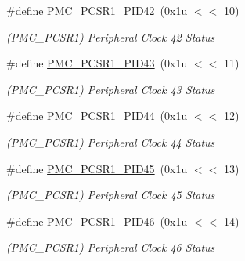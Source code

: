\begin{DoxyCompactItemize}
\mbox{\label{group__SAMV71__PMC_gaa9dabc6093c0bf2f44a76f602881e210}} 
\#define \mbox{\hyperlink{group__SAMV71__PMC_gaa9dabc6093c0bf2f44a76f602881e210}{P\+M\+C\+\_\+\+P\+C\+S\+R1\+\_\+\+P\+I\+D42}}~(0x1u $<$$<$ 10)
\begin{DoxyCompactList}\small\item\em (P\+M\+C\+\_\+\+P\+C\+S\+R1) Peripheral Clock 42 Status \end{DoxyCompactList}\item 
\mbox{\label{group__SAMV71__PMC_ga373fe9910cd34f16ddfe94f47b70b156}} 
\#define \mbox{\hyperlink{group__SAMV71__PMC_ga373fe9910cd34f16ddfe94f47b70b156}{P\+M\+C\+\_\+\+P\+C\+S\+R1\+\_\+\+P\+I\+D43}}~(0x1u $<$$<$ 11)
\begin{DoxyCompactList}\small\item\em (P\+M\+C\+\_\+\+P\+C\+S\+R1) Peripheral Clock 43 Status \end{DoxyCompactList}\item 
\mbox{\label{group__SAMV71__PMC_ga39088bffa9395fcc9a36b177be66f004}} 
\#define \mbox{\hyperlink{group__SAMV71__PMC_ga39088bffa9395fcc9a36b177be66f004}{P\+M\+C\+\_\+\+P\+C\+S\+R1\+\_\+\+P\+I\+D44}}~(0x1u $<$$<$ 12)
\begin{DoxyCompactList}\small\item\em (P\+M\+C\+\_\+\+P\+C\+S\+R1) Peripheral Clock 44 Status \end{DoxyCompactList}\item 
\mbox{\label{group__SAMV71__PMC_gaa76b2bc1b35ecaa102bf67d62b2b8cc3}} 
\#define \mbox{\hyperlink{group__SAMV71__PMC_gaa76b2bc1b35ecaa102bf67d62b2b8cc3}{P\+M\+C\+\_\+\+P\+C\+S\+R1\+\_\+\+P\+I\+D45}}~(0x1u $<$$<$ 13)
\begin{DoxyCompactList}\small\item\em (P\+M\+C\+\_\+\+P\+C\+S\+R1) Peripheral Clock 45 Status \end{DoxyCompactList}\item 
\mbox{\label{group__SAMV71__PMC_ga0fefdfeff233dd72261c66e41433fb6d}} 
\#define \mbox{\hyperlink{group__SAMV71__PMC_ga0fefdfeff233dd72261c66e41433fb6d}{P\+M\+C\+\_\+\+P\+C\+S\+R1\+\_\+\+P\+I\+D46}}~(0x1u $<$$<$ 14)
\begin{DoxyCompactList}\small\item\em (P\+M\+C\+\_\+\+P\+C\+S\+R1) Peripheral Clock 46 Status \end{DoxyCompactList}\item 
$$
\end{DoxyCompactItemize}
